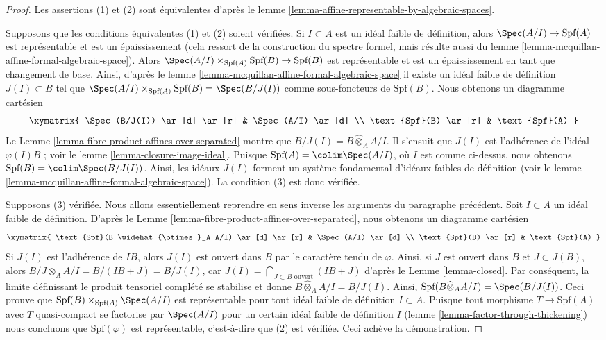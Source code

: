 \begin{proof}
Les assertions (1) et (2) sont équivalentes d'après le
lemme \ref{lemma-affine-representable-by-algebraic-spaces}.

\medskip\noindent
Supposons que les conditions équivalentes (1) et (2) soient vérifiées.
Si $I \subset A$ est un idéal faible de définition, alors
$\Spec(A/I) \to \text{Spf}(A)$ est représentable et est un épaississement
(cela ressort de la construction du spectre formel,
mais résulte aussi du
lemme \ref{lemma-mcquillan-affine-formal-algebraic-space}).
Alors $\Spec(A/I) \times_{\text{Spf}(A)} \text{Spf}(B) \to \text{Spf}(B)$
est représentable et est un épaississement en tant que changement de base.
Ainsi, d'après le
lemme \ref{lemma-mcquillan-affine-formal-algebraic-space}
il existe un idéal faible de définition $J(I) \subset B$ tel que
$\Spec(A/I) \times_{\text{Spf}(A)} \text{Spf}(B) = \Spec(B/J(I))$
comme sous-foncteurs de $\text{Spf}(B)$. Nous obtenons un diagramme cartésien
$$
\xymatrix{
\Spec(B/J(I)) \ar[d] \ar[r] & \Spec(A/I) \ar[d] \\
\text{Spf}(B) \ar[r] & \text{Spf}(A)
}
$$
Le Lemme \ref{lemma-fibre-product-affines-over-separated}
montre que $B/J(I) = B \widehat{\otimes}_A A/I$.
Il s'ensuit que $J(I)$ est l'adhérence de l'idéal $\varphi(I)B$ ; voir le
lemme \ref{lemma-closure-image-ideal}.
Puisque $\text{Spf}(A) = \colim \Spec(A/I)$, où $I$ est comme ci-dessus,
nous obtenons $\text{Spf}(B) = \colim \Spec(B/J(I))$.
Ainsi, les idéaux $J(I)$ forment un système fondamental d'idéaux faibles
de définition (voir le
lemme \ref{lemma-mcquillan-affine-formal-algebraic-space}).
La condition (3) est donc vérifiée.

\medskip\noindent
Supposons (3) vérifiée. Nous allons essentiellement reprendre en sens inverse les
arguments du paragraphe précédent.
Soit $I \subset A$ un idéal faible de définition.
D'après le Lemme \ref{lemma-fibre-product-affines-over-separated},
nous obtenons un diagramme cartésien
$$
\xymatrix{
\text{Spf}(B \widehat{\otimes}_A A/I) \ar[d] \ar[r] & \Spec(A/I) \ar[d] \\
\text{Spf}(B) \ar[r] & \text{Spf}(A)
}
$$
Si $J(I)$ est l'adhérence de $IB$, alors $J(I)$ est ouvert dans $B$
par le caractère tendu de $\varphi$. Ainsi, si $J$ est ouvert dans $B$ et $J \subset J(B)$,
alors $B/J \otimes_A A/I = B/(IB + J) = B/J(I)$, car
$J(I) = \bigcap_{J \subset B\text{ ouvert}} (IB + J)$ d'après le Lemme \ref{lemma-closed}.
Par conséquent, la limite définissant le produit tensoriel complété se stabilise et donne
$B \widehat{\otimes}_A A/I = B/J(I)$.
Ainsi, $\text{Spf}(B \widehat{\otimes}_A A/I) = \Spec(B/J(I))$.
Ceci prouve que $\text{Spf}(B) \times_{\text{Spf}(A)} \Spec(A/I)$
est représentable pour tout idéal faible de définition $I \subset A$.
Puisque tout morphisme $T \to \text{Spf}(A)$ avec $T$ quasi-compact
se factorise par $\Spec(A/I)$ pour un certain idéal faible de définition $I$
(lemme \ref{lemma-factor-through-thickening})
nous concluons que $\text{Spf}(\varphi)$ est représentable, c'est-à-dire que
(2) est vérifiée. Ceci achève la démonstration.
\end{proof}

